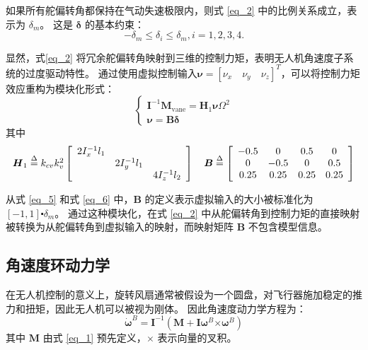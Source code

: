如果所有舵偏转角都保持在气动失速极限内，则式 \eqref{eq_2} 中的比例关系成立，表示为 $ {{\delta }_{m}} $。 这是 ${\boldsymbol \delta}$ 的基本约束：
\begin{equation} 
	- {\delta _m} \le {\delta _i} \le {\delta _m},   i = 1,2,3,4.
	\label{eq_4}
\end{equation}

显然，式\eqref{eq_2} 将冗余舵偏转角映射到三维的控制力矩，表明无人机角速度子系统的过度驱动特性。 通过使用虚拟控制输入$ \boldsymbol{\nu }=[{\nu }_{x} \quad {\nu }_{y} \quad {\nu }_{z}]^{T}$，可以将控制力矩效应重构为模块化形式：
\begin{equation}
	\left\{ \begin{array}{l}
	{{\boldsymbol{I}}^{ - 1}}{{\boldsymbol{M}}_\text{vane}} = {{\boldsymbol{H}}_1}{\boldsymbol{\nu }}{\Omega ^2}\\
	{\boldsymbol{\nu }} = {\boldsymbol{B\delta }}
	\end{array} \right.
	\label{eq_5}
	\end{equation}
其中
	\begin{equation}
	\begin{array}{ccccc}
	{{\boldsymbol{H}}_1} \buildrel \Delta \over =   {k_{cv}}k_v^2\left[ {\begin{array}{*{20}{c}}
		{2I_x^{ - 1}{l_1}}&{}&{}\\
		{}&{2I_y^{ - 1}{l_1}}&{}\\
		{}&{}&{4I_z^{ - 1}{l_2}}
		\end{array}} \right]     \quad
	{\boldsymbol{B}} \buildrel \Delta \over =   \left[ {\begin{array}{*{20}{c}}
		{ - 0.5}&0&{0.5}&0\\
		0&{ - 0.5}&0&{0.5}\\
		{0.25}&{0.25}&{0.25}&{0.25}
		\end{array}} \right]
	\end{array}
	\label{eq_6}
\end{equation}

从式 \eqref{eq_5} 和式 \eqref{eq_6} 中，$\boldsymbol{B}$ 的定义表示虚拟输入的大小被标准化为 $[-1,1] \centerdot {{\delta }_{m }}$。 通过这种模块化，在式 \eqref{eq_2} 中从舵偏转角到控制力矩的直接映射被转换为从舵偏转角到虚拟输入的映射，而映射矩阵 $\boldsymbol{B}$ 不包含模型信息。


\subsection{角速度环动力学}
在无人机控制的意义上，旋转风扇通常被假设为一个圆盘，对飞行器施加稳定的推力和扭矩，因此无人机可以被视为刚体。 因此角速度动力学方程为：
\begin{equation}
	{{\boldsymbol{\dot \omega }}^B} = {{\boldsymbol{I}}^{ - 1}}\left( {{\boldsymbol{M + I}}{{\boldsymbol{\omega }}^B}{\boldsymbol{ \times }}{{\boldsymbol{\omega }}^B}} \right)
	\label{eq_16}
\end{equation}
其中 $\boldsymbol M$ 由式 \eqref{eq_1} 预先定义，$\times$ 表示向量的叉积。

